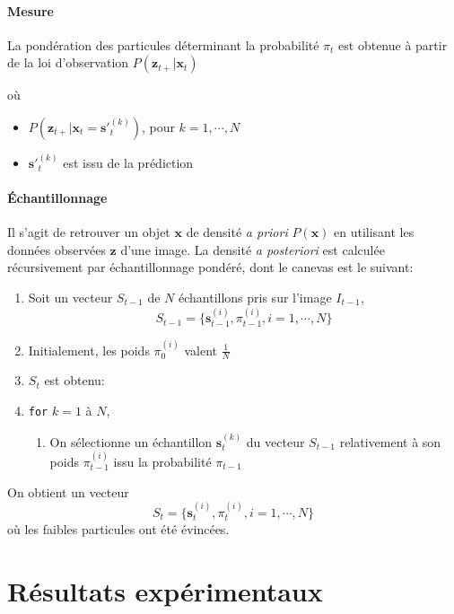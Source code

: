 \documentclass[a4paper,12pt]{report}
\begin{document}
\subsubsection{Mesure}

La pondération des particules déterminant la probabilité $\pi_t$ est obtenue à partir de la loi d'observation $P(\mathbf{z}_{t+}|\mathbf{x}_{t})$ 

où
\begin{itemize}
\item[] $P(\mathbf{z}_{t+}|\mathbf{x}_{t} = \mathbf{s'}_{t}^{(k)})$, pour $k = 1,\cdots,N$
\item[] $\mathbf{s'}_{t}^{(k)}$ est issu de la prédiction
\end{itemize}
   

\subsubsection{Échantillonnage}
Il s'agit de retrouver un objet $\mathbf{x}$ de densité \textit{a priori} $P(\mathbf{x})$ en utilisant les données observées $\mathbf{z}$ d'une image.
La densité \textit{a posteriori} est calculée récursivement par échantillonnage pondéré, dont le canevas est le suivant:
\begin{enumerate}
\item Soit un vecteur $S_{t-1}$ de $N$ échantillons pris sur l'image $I_{t-1}$,
$$S_{t-1}=\{ \mathbf{s}_{t-1}^{(i)}, \pi_{t-1}^{(i)}, i=1,\cdots,N\}$$
\item[] Initialement, les poids $\pi_0^{(i)}$ valent $\frac{1}{N}$ 
\item $S_t$ est obtenu:
\item[]\verb+for+ $k=1$ à $N$,
\begin{enumerate}
\item[] On sélectionne un échantillon $\mathbf{s}_t^{(k)}$ du vecteur $S_{t-1}$ relativement à son poids $\pi_{t-1}^{(i)}$ issu la probabilité $\pi_{t-1}$
\end{enumerate}
\end{enumerate} 

On obtient un vecteur $$S_{t}=\{ \mathbf{s}_{t}^{(i)}, \pi_{t}^{(i)}, i=1,\cdots,N\}$$ où les faibles particules ont été évincées.




\chapter{Résultats expérimentaux}
\end{document}
